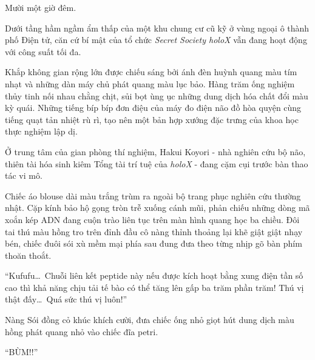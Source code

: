 \documentclass[../main.tex]{subfiles}
\begin{document}

Mười một giờ đêm.

Dưới tầng hầm ngầm ẩm thấp của một khu chung cư cũ kỹ ở vùng ngoại ô thành phố Điện tử, căn cứ bí mật của tổ chức \textit{Secret Society holoX} vẫn đang hoạt động với công suất tối đa.

Khắp không gian rộng lớn được chiếu sáng bởi ánh đèn huỳnh quang màu tím nhạt và những dàn máy chủ phát quang màu lục bảo. Hàng trăm ống nghiệm thủy tinh nối nhau chằng chịt, sủi bọt ùng ục những dung dịch hóa chất đổi màu kỳ quái. Những tiếng bíp bíp đơn điệu của máy đo điện não đồ hòa quyện cùng tiếng quạt tản nhiệt rù rì, tạo nên một bản hợp xướng đặc trưng của khoa học thực nghiệm lập dị.

Ở trung tâm của gian phòng thí nghiệm, Hakui Koyori - nhà nghiên cứu bộ não, thiên tài hóa sinh kiêm Tổng tài trí tuệ của \textit{holoX} - đang cặm cụi trước bàn thao tác vi mô.

Chiếc áo blouse dài màu trắng trùm ra ngoài bộ trang phục nghiên cứu thường nhật. Cặp kính bảo hộ gọng tròn trễ xuống cánh mũi, phản chiếu những dòng mã xoắn kép ADN đang cuộn trào liên tục trên màn hình quang học ba chiều. Đôi tai thú màu hồng tro trên đỉnh đầu cô nàng thỉnh thoảng lại khẽ giật giật nhạy bén, chiếc đuôi sói xù mềm mại phía sau đung đưa theo từng nhịp gõ bàn phím thoăn thoắt.

``Kufufu\dots\ Chuỗi liên kết peptide này nếu được kích hoạt bằng xung điện tần số cao thì khả năng chịu tải tế bào có thể tăng lên gấp ba trăm phần trăm! Thú vị thật đấy\dots\ Quá sức thú vị luôn!''

Nàng Sói đồng cỏ khúc khích cười, đưa chiếc ống nhỏ giọt hút dung dịch màu hồng phát quang nhỏ vào chiếc đĩa petri.

``BÙM!!''
\end{document}

